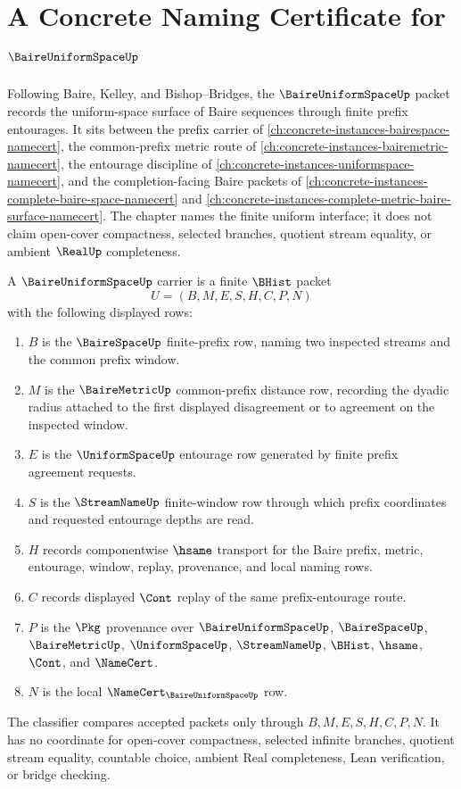 \chapter{A Concrete Naming Certificate for $\BaireUniformSpaceUp$}
\label{ch:concrete-instances-baire-uniform-space-namecert}

Following Baire, Kelley, and Bishop--Bridges, the $\BaireUniformSpaceUp$ packet records the uniform-space surface of Baire sequences through finite prefix entourages. It sits between the prefix carrier of \autoref{ch:concrete-instances-bairespace-namecert}, the common-prefix metric route of \autoref{ch:concrete-instances-bairemetric-namecert}, the entourage discipline of \autoref{ch:concrete-instances-uniformspace-namecert}, and the completion-facing Baire packets of \autoref{ch:concrete-instances-complete-baire-space-namecert} and \autoref{ch:concrete-instances-complete-metric-baire-surface-namecert}. The chapter names the finite uniform interface; it does not claim open-cover compactness, selected branches, quotient stream equality, or ambient $\RealUp$ completeness.

\begin{definition}
\label{def:baire-uniform-space-carrier}
A $\BaireUniformSpaceUp$ carrier is a finite $\BHist$ packet
$$
U=(B,M,E,S,H,C,P,N)
$$
with the following displayed rows:
\begin{enumerate}
\item $B$ is the $\BaireSpaceUp$ finite-prefix row, naming two inspected streams and the common prefix window.
\item $M$ is the $\BaireMetricUp$ common-prefix distance row, recording the dyadic radius attached to the first displayed disagreement or to agreement on the inspected window.
\item $E$ is the $\UniformSpaceUp$ entourage row generated by finite prefix agreement requests.
\item $S$ is the $\StreamNameUp$ finite-window row through which prefix coordinates and requested entourage depths are read.
\item $H$ records componentwise $\hsame$ transport for the Baire prefix, metric, entourage, window, replay, provenance, and local naming rows.
\item $C$ records displayed $\Cont$ replay of the same prefix-entourage route.
\item $P$ is the $\Pkg$ provenance over $\BaireUniformSpaceUp$, $\BaireSpaceUp$, $\BaireMetricUp$, $\UniformSpaceUp$, $\StreamNameUp$, $\BHist$, $\hsame$, $\Cont$, and $\NameCert$.
\item $N$ is the local $\NameCert_{\BaireUniformSpaceUp}$ row.
\end{enumerate}
The classifier compares accepted packets only through $B,M,E,S,H,C,P,N$. It has no coordinate for open-cover compactness, selected infinite branches, quotient stream equality, countable choice, ambient Real completeness, Lean verification, or bridge checking.
\end{definition}

